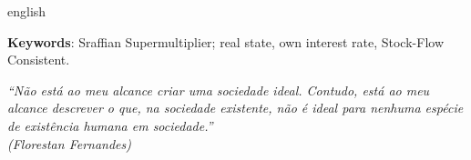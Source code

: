 \documentclass[
12pt,				%
openright,			%
oneside,			%
a4paper,		%
english,			%
brazil,				%
sumario=tradicional,
]{abntex2}
\begin{document}
\begin{resumo}
\begin{otherlanguage*}{english}
	\vspace{\onelineskip}
	
	\noindent\textbf{Keywords}: Sraffian Supermultiplier; real state, own interest rate, Stock-Flow Consistent. 
	
\end{otherlanguage*}
\end{resumo}

\begin{epigrafe}
	\vspace*{\fill}
	\begin{flushright}
		\textit{``Não está ao meu alcance criar uma sociedade ideal. Contudo, está ao meu alcance descrever o que, na sociedade existente, não é ideal para nenhuma espécie de existência humana em sociedade.''\\
			(Florestan Fernandes)}
	\end{flushright}
\end{epigrafe}
\newpage

\tableofcontents*
\newpage
%
%
%
\listoffigures*
{}
\newpage
%
\listoftables*
{}
\newpage
%

\end{document}
